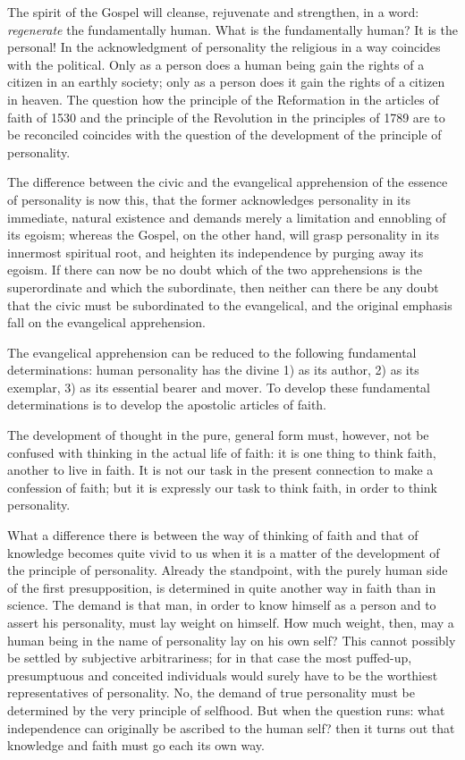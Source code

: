 \documentclass[12pt]{book}
\newcommand{\opage}[1]{\marginnote{\footnotesize\textit{[#1]}}}
\begin{document}
The spirit of the Gospel will cleanse, rejuvenate and strengthen, in a
word: \textit{regenerate} the fundamentally human. What is the
fundamentally human? It is the personal! In the acknowledgment of
personality the religious in a way coincides with the political. Only as
a person does a human being gain the rights of a citizen in an earthly
society; only as a person does it gain the rights of a citizen in
heaven. The question how the principle of the Reformation in the
articles of faith of 1530 and the principle of the Revolution in the
principles of
\opage{138}\setcounter{footnote}{0}%
1789 are to be reconciled coincides with the question of the development
of the principle of personality.

The difference between the civic and the evangelical apprehension of
the essence of personality is now this, that the former acknowledges
personality in its immediate, natural existence and demands merely a
limitation and ennobling of its egoism; whereas the Gospel, on the other
hand, will grasp personality in its innermost spiritual root, and
heighten its independence by purging away its egoism. If there can now
be no doubt which of the two apprehensions is the superordinate and
which the subordinate, then neither can there be any doubt that the
civic must be subordinated to the evangelical, and the original emphasis
fall on the evangelical apprehension.

The evangelical apprehension can be reduced to the following fundamental
determinations: human personality has the divine 1) as its author, 2) as
its exemplar, 3) as its essential bearer and mover. To develop these
fundamental determinations is to develop the apostolic articles of
faith.

The development of thought in the pure, general form must, however, not
be confused with thinking in the actual life of faith: it is one thing
to think faith, another to live in faith. It is not our task in the
present connection to make a confession of faith; but it is expressly
our task to think faith, in order to think personality.

What a difference there is between the way of thinking of faith and that
of knowledge becomes quite vivid to us when it is a matter of the
development of the principle of personality. Already the standpoint,
with the purely human side of the first presupposition, is determined
in quite another way in faith than in science. The demand is that man,
in order to know himself as a person and to assert his personality, must
\opage{139}\setcounter{footnote}{0}%
lay weight on himself. How much weight, then, may a human being in the
name of personality lay on his own self? This cannot possibly be settled
by subjective arbitrariness; for in that case the most puffed-up,
presumptuous and conceited individuals would surely have to be the
worthiest representatives of personality. No, the demand of true
personality must be determined by the very principle of selfhood. But
when the question runs: what independence can originally be ascribed to
the human self? then it turns out that knowledge and faith must go
each its own way.
\end{document}
